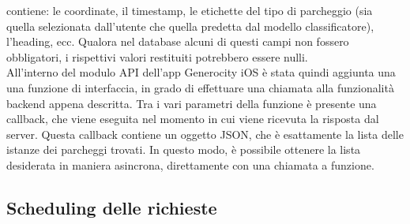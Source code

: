 contiene: le coordinate, il timestamp, le etichette del tipo di parcheggio (sia quella 
selezionata dall'utente che quella predetta dal modello classificatore), l'heading, ecc.
Qualora nel database alcuni di questi campi non fossero obbligatori, i rispettivi valori 
restituiti potrebbero essere nulli.\\
All'interno del modulo API dell'app Generocity iOS è stata quindi aggiunta una una funzione
di interfaccia, in grado di effettuare una chiamata alla funzionalità backend appena descritta.
Tra i vari parametri della funzione è presente una callback, che viene eseguita nel momento in cui
viene ricevuta la risposta dal server. Questa callback contiene un oggetto JSON, che è esattamente
la lista delle istanze dei parcheggi trovati. In questo modo, è possibile ottenere la lista desiderata in maniera asincrona, direttamente con una chiamata a funzione. 

\subsection{Scheduling delle richieste}

